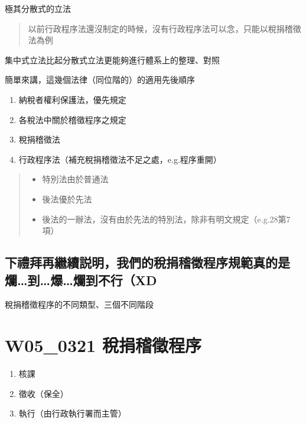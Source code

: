\documentclass[]{ctexbook}
\providecommand{\tightlist}{%
  \setlength{\itemsep}{0pt}\setlength{\parskip}{0pt}}
\begin{document}
極其分散式的立法

\begin{quote}
以前行政程序法還沒制定的時候，沒有行政程序法可以念，只能以稅捐稽徵法為例
\end{quote}

集中式立法比起分散式立法更能夠進行體系上的整理、對照

簡單來講，這幾個法律（同位階的）的適用先後順序

\begin{enumerate}
\def\labelenumi{\arabic{enumi}.}
\tightlist
\item
  納稅者權利保護法，優先規定
\item
  各稅法中關於稽徵程序之規定
\item
  稅捐稽徵法
\item
  行政程序法（補充稅捐稽徵法不足之處，e.g.程序重開）
\end{enumerate}

\begin{quote}
\begin{itemize}
\tightlist
\item
  特別法由於普通法
\item
  後法優於先法
\item
  後法的一辦法，沒有由於先法的特別法，除非有明文規定（e.g.28第7項）
\end{itemize}
\end{quote}

\hypertarget{ux4e0bux79aeux62dcux518dux7e7cux7e8cux8aacux660eux6211ux5011ux7684ux7a05ux6350ux7a3dux5fb5ux7a0bux5e8fux898fux7bc4ux771fux7684ux662fux721bux5230ux7206ux721bux5230ux4e0dux884cxd}{%
\section{下禮拜再繼續説明，我們的稅捐稽徵程序規範真的是爛\ldots 到\ldots 爆\ldots 爛到不行（XD}\label{ux4e0bux79aeux62dcux518dux7e7cux7e8cux8aacux660eux6211ux5011ux7684ux7a05ux6350ux7a3dux5fb5ux7a0bux5e8fux898fux7bc4ux771fux7684ux662fux721bux5230ux7206ux721bux5230ux4e0dux884cxd}}

稅捐稽徵程序的不同類型、三個不同階段

\hypertarget{w05_0321-ux7a05ux6350ux7a3dux5fb5ux7a0bux5e8f}{%
\chapter{W05\_0321 稅捐稽徵程序}\label{w05_0321-ux7a05ux6350ux7a3dux5fb5ux7a0bux5e8f}}

\begin{enumerate}
\def\labelenumi{\arabic{enumi}.}
\tightlist
\item
  核課
\item
  徵收（保全）
\item
  執行（由行政執行署而主管）
\end{enumerate}
\end{document}

